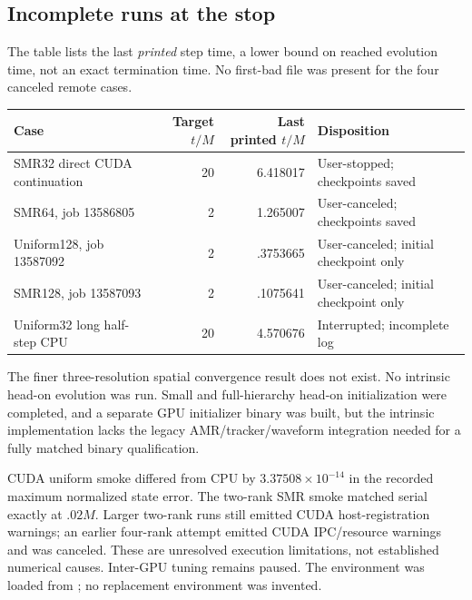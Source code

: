 \documentclass[11pt,letterpaper]{article}
\newcommand{\src}[1]{\texttt{\small\path{#1}}}
\begin{document}
\subsection{Incomplete runs at the stop}
The table lists the last \emph{printed} step time, a lower bound on reached evolution time, not an exact termination time. No first-bad file was present for the four canceled remote cases.
\begin{center}\small\begin{tabular}{lrrl}\toprule
Case & Target $t/M$ & Last printed $t/M$ & Disposition\\\midrule
SMR32 direct CUDA continuation & 20 & 6.418017 & User-stopped; checkpoints saved\\
SMR64, job 13586805 & 2 & 1.265007 & User-canceled; checkpoints saved\\
Uniform128, job 13587092 & 2 & .3753665 & User-canceled; initial checkpoint only\\
SMR128, job 13587093 & 2 & .1075641 & User-canceled; initial checkpoint only\\
Uniform32 long half-step CPU & 20 & 4.570676 & Interrupted; incomplete log\\\bottomrule
\end{tabular}\end{center}
The finer three-resolution spatial convergence result does not exist. No intrinsic head-on evolution was run. Small and full-hierarchy head-on initialization were completed, and a separate GPU initializer binary was built, but the intrinsic implementation lacks the legacy AMR/tracker/waveform integration needed for a fully matched binary qualification.

CUDA uniform smoke differed from CPU by $3.37508\times10^{-14}$ in the recorded maximum normalized state error. The two-rank SMR smoke matched serial exactly at $.02M$. Larger two-rank runs still emitted CUDA host-registration warnings; an earlier four-rank attempt emitted CUDA IPC/resource warnings and was canceled. These are unresolved execution limitations, not established numerical causes. Inter-GPU tuning remains paused. The environment was loaded from \src{/home/hz0693/athenak_env}; no replacement environment was invented.

\end{document}

